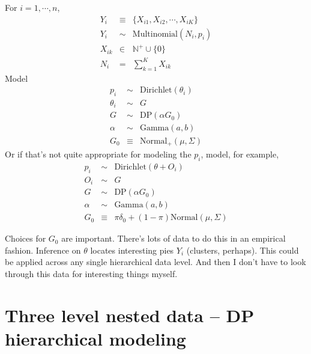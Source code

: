 \documentclass[11pt]{article}
\begin{document}
For $i = 1, \cdots, n$, 
\begin{eqnarray*}
Y_i &\equiv&  \{X_{i1}, X_{i2}, \cdots, X_{iK}\}\\
Y_i &\sim& \text{Multinomial}(N_i, p_i)\\
 X_{ik} &\in&  \mathbb{N}^+ \cup \{0\}\\
 N_i  &=& \sum_{k=1}^K X_{ik}
\end{eqnarray*}
Model 
\begin{eqnarray*}
p_i &\sim & \text{Dirichlet}(\theta_i)\\ 
\theta_i & \sim & G\\
G &\sim & \text{DP}(\alpha G_0) \\ 
\alpha &\sim& \text{Gamma}(a,b)\\
G_0 &\equiv& \text{Normal}_+(\mu,\Sigma) 
\end{eqnarray*}
Or if that's not quite appropriate for modeling the $p_i$, model, for example, 
\begin{eqnarray*}
p_i & \sim & \text{Dirichlet}(\theta + O_i)\\ 
O_i & \sim & G \\
G & \sim & \text{DP}(\alpha G_0) \\ 
\alpha &\sim& \text{Gamma}(a,b)\\
G_0 &\equiv& \pi \delta_0 + (1-\pi) \text{Normal}(\mu,\Sigma) 
\end{eqnarray*}

Choices for $G_0$ are important.
There's lots of data to do this in an empirical fashion.  
Inference on $\theta$ locates interesting pies $Y_i$ (clusters, perhaps).  
This could be applied across any single hierarchical data level.   
And then I don't have to look through this data for interesting things myself.  

\section{Three level nested data -- DP hierarchical modeling}
\end{document}

